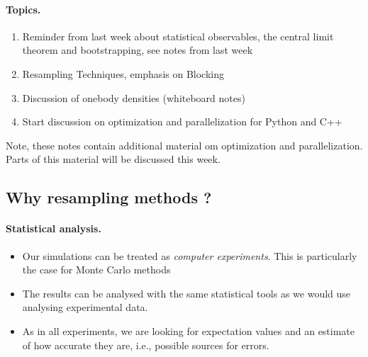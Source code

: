 \documentclass[%
oneside,                 %
final,                   %
10pt]{article}
\begin{document}
\paragraph{Topics.}
\begin{enumerate}
\item Reminder from last week about statistical observables, the central limit theorem and bootstrapping, see notes from last week

\item Resampling Techniques, emphasis on  Blocking 

\item Discussion of onebody densities (whiteboard notes)

\item Start discussion on optimization and parallelization for Python and C++
\end{enumerate}

\noindent



Note, these notes contain additional material om optimization and parallelization. Parts of this material will be discussed this week.

\subsection{Why resampling methods ?}

\paragraph{Statistical analysis.}
\begin{itemize}
\item Our simulations can be treated as \emph{computer experiments}. This is particularly the case for Monte Carlo methods

\item The results can be analysed with the same statistical tools as we would use analysing experimental data.

\item As in all experiments, we are looking for expectation values and an estimate of how accurate they are, i.e., possible sources for errors.
\end{itemize}
\end{document}
